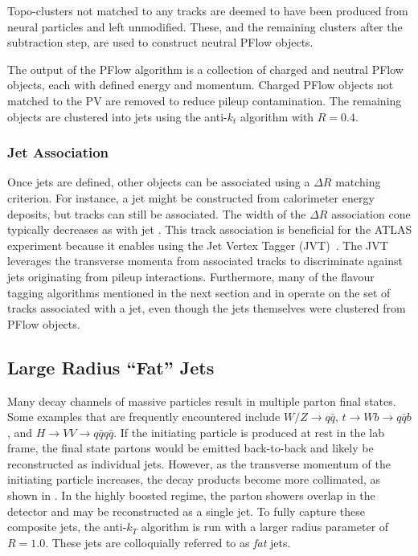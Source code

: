 Topo-clusters not matched to any tracks are deemed to have been produced from neural particles and left unmodified.
These, and the remaining clusters after the subtraction step, are used to construct neutral PFlow objects.

The output of the PFlow algorithm is a collection of charged and neutral PFlow objects, each with defined energy and momentum.
Charged PFlow objects not matched to the PV are removed to reduce pileup contamination.
The remaining objects are clustered into jets using the anti-$k_t$ algorithm with $R=0.4$.

\subsubsection{Jet Association}

Once jets are defined, other objects can be associated using a $\Delta R$ matching criterion.
For instance, a jet might be constructed from calorimeter energy deposits, but tracks can still be associated.
The width of the $\Delta R$ association cone typically decreases as with jet \pt.
This track association is beneficial for the ATLAS experiment because it enables using the Jet Vertex Tagger (JVT)~\cite{JVT}.
The JVT leverages the transverse momenta from associated tracks to discriminate against jets originating from pileup interactions.
Furthermore, many of the flavour tagging algorithms mentioned in the next section and in  operate on the set of tracks associated with a jet, even though the jets themselves were clustered from PFlow objects.

\subsection{Large Radius ``Fat'' Jets}

Many decay channels of massive particles result in multiple parton final states.
Some examples that are frequently encountered include $W/Z \rightarrow q \bar{q}$, $t \rightarrow Wb \rightarrow q \bar{q} b$, and $H \rightarrow VV \rightarrow q \bar{q} q \bar{q}$.
If the initiating particle is produced at rest in the lab frame, the final state partons would be emitted back-to-back and likely be reconstructed as individual jets.
However, as the transverse momentum of the initiating particle increases, the decay products become more collimated, as shown in .
In the highly boosted regime, the parton showers overlap in the detector and may be reconstructed as a single jet.
To fully capture these composite jets, the anti-$k_T$ algorithm is run with a larger radius parameter of $R=1.0$.
These jets are colloquially referred to as \textit{fat} jets.


